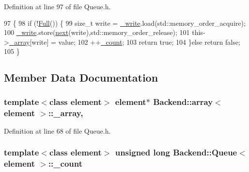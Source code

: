 Definition at line 97 of file Queue.\+h.


\begin{DoxyCode}
97                                         \{
98             \textcolor{keywordflow}{if} (!\hyperlink{class_backend_1_1_queue_acb0a8bd00d4708253e5d25465191dca1}{Full}()) \{
99                 \textcolor{keywordtype}{size\_t} write = \hyperlink{class_backend_1_1_queue_ab3d5c4738092cf356b36c56f6ab61554}{\_write}.load(std::memory\_order\_acquire);
100                 \hyperlink{class_backend_1_1_queue_ab3d5c4738092cf356b36c56f6ab61554}{\_write}.store(\hyperlink{class_backend_1_1_queue_a91b2f12926d36b547343a91790fe76bb}{next}(write),std::memory\_order\_release);
101                 this->\hyperlink{class_backend_1_1array_ac588c1e30c2c4748bc9a5bb12b9320af}{\_array}[write] = value;
102                 ++\hyperlink{class_backend_1_1_queue_ab49d17e24dc0f8a2e5e44c182c240249}{\_count};
103                 \textcolor{keywordflow}{return} \textcolor{keyword}{true};
104             \}\textcolor{keywordflow}{else} \textcolor{keywordflow}{return} \textcolor{keyword}{false};
105         \}
\end{DoxyCode}


\subsection{Member Data Documentation}
\hypertarget{class_backend_1_1array_ac588c1e30c2c4748bc9a5bb12b9320af}{
\subsubsection[{\+\_\+array}]{\setlength{\rightskip}{0pt plus 5cm}template$<$class element$>$ element$\ast$ {\bf Backend\+::array}$<$ element $>$\+::\+\_\+array\hspace{0.3cm}{\ttfamily [protected]}, {\ttfamily [inherited]}}}\label{class_backend_1_1array_ac588c1e30c2c4748bc9a5bb12b9320af}


Definition at line 68 of file Queue.\+h.

\hypertarget{class_backend_1_1_queue_ab49d17e24dc0f8a2e5e44c182c240249}{
\subsubsection[{\+\_\+count}]{\setlength{\rightskip}{0pt plus 5cm}template$<$class element$>$ unsigned long {\bf Backend\+::\+Queue}$<$ element $>$\+::\+\_\+count\hspace{0.3cm}{\ttfamily [protected]}}}\label{class_backend_1_1_queue_ab49d17e24dc0f8a2e5e44c182c240249}


